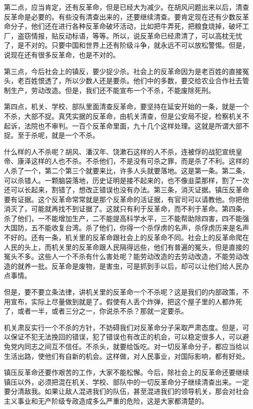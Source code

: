 第二点，应当肯定，还有反革命，但是已经大为减少。在胡风问题出来以后，清查反革命是必要的。有些没有清查出来的，还要继续清查。要肯定现在还有少数反革命分子，他们还在进行各种反革命破坏活动，比如把牛弄死，把粮食烧掉，破坏工厂，盗窃情报，贴反动标语，等等。所以，说反革命已经肃清了，可以高枕无忧了，是不对的。只要中国和世界上还有阶级斗争，就永远不可以放松警惕。但是，说现在还有很多反革命，也是不对的。

第三点，今后社会上的镇反，要少捉少杀。社会上的反革命因为是老百姓的直接冤头，老百姓恨透了，所以少数人还是要杀。他们中的多数，要交给农业合作社去管制生产，劳动改造。但是，我们还不能宣布一个不杀，不能废除死刑。

第四点，机关、学校、部队里面清查反革命，要坚持在延安开始的一条，就是一个不杀，大部不捉。真凭实据的反革命，由机关清查，但是公安局不捉，检察机关不起诉，法院也不审判。一百个反革命里面，九十几个这样处理。这就是所谓大部不捉。至于杀呢，就是一个不杀。

什么样的人不杀呢？胡风、潘汉年、饶漱石这样的人不杀，连被俘的战犯宣统皇帝、康泽这样的人也不杀。不杀他们，不是没有可杀之罪，而是杀了不利。这样的人杀了一个，第二个第三个就要来比，许多人头就要落地。这是第一条。第二条，可以杀错人。一颗脑袋落地，历史证明是接不起来的，也不像韭菜那样，割了一次还可以长起来，割错了，想改正错误也没有办法。第三条，消灭证据。镇压反革命要有证据。这个反革命常常就是那个反革命的活证据，有官司可以请教他。你把他消灭了，可能就再找不到证据了。这就只有利于反革命，而不利于革命。第四条，杀了他们，一不能增加生产，二不能提高科学水平，三不能帮助除四害，四不能强大国防，五不能收复台湾。杀了他们，你得一个杀俘虏的名声，杀俘虏历来是名声不好的。还有一条，机关里的反革命跟社会上的反革命不同。社会上的反革命爬在人民的头上，而机关里的反革命跟人民隔得远些，他们有普遍的冤头，但是直接的冤头不多。这些人一个不杀有什么害处呢？能劳动改造的去劳动改造，不能劳动改造的就养一批。反革命是废物，是害虫，可是抓到手以后，却可以让他们给人民办点事情。

但是，要不要立条法律，讲机关里的反革命一个不杀呢？这是我们的内部政策，不用宣布，实际上尽量做到就是了。假使有人丢个炸弹，把这个屋子里的人都炸死了，或者一半，或者三分之一，你说杀不杀？那就一定要杀。

机关肃反实行一个不杀的方针，不妨碍我们对反革命分子采取严肃态度。但是，可以保证不犯无法挽回的错误，犯了错误也有改正的机会，可以稳定很多人，可以避免党内同志之间互不信任。不杀头，就要给饭吃。对一切反革命分子，都应当给以生活出路，使他们有自新的机会。这样做，对人民事业，对国际影响，都有好处。

镇压反革命还要作艰苦的工作，大家不能松懈。今后，除社会上的反革命还要继续镇压以外，必须把混在机关、学校、部队中的一切反革命分子继续清查出来。一定要分清敌我。如果让敌人混进我们的队伍，甚至混进我们的领导机关，那会对社会主义事业和无产阶级专政造成多么严重的危险，这是大家都清楚的。

